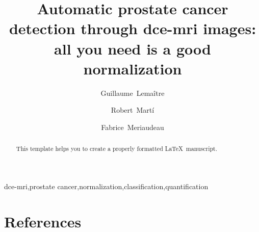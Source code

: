 \documentclass[review]{elsarticle}
\begin{document}
\begin{frontmatter}

\title{Automatic prostate cancer detection through \acs*{dce}-\acs*{mri} images: all you need is a good normalization}

\author[label1,label3]{Guillaume~Lema\^itre}
\author[label3]{Robert~Mart\'i}
\author[label1,label6]{Fabrice~Meriaudeau}
\address[label1]{\scriptsize LE2I UMR6306, CNRS, Arts et M\'etiers, Univ. Bourgogne Franche-Comt\'e, 12 rue de la Fonderie, 71200 Le Creusot, France}
\address[label3]{\scriptsize ViCOROB, Universitat de Girona, Campus Montilivi, Edifici P4, 17071 Girona, Spain}
\address[label6]{\scriptsize CISIR, Electrical \& Electronic Engineering Department, Universiti Teknologi Petronas, 32610 Seri Iskandar, Perak, Malaysia}

\begin{abstract}
This template helps you to create a properly formatted \LaTeX\ manuscript.
\end{abstract}

\begin{keyword}
\acs*{dce}-\acs*{mri}\sep prostate cancer\sep normalization\sep classification\sep quantification
\end{keyword}

\end{frontmatter}

\acresetall
\linenumbers







\section*{References}


\end{document}
